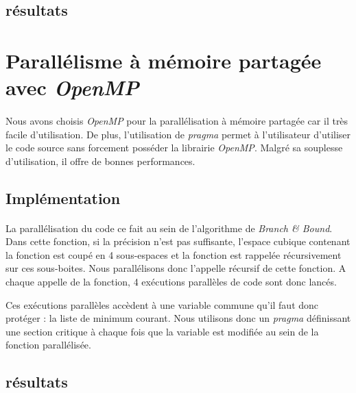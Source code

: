 \documentclass[a4paper]{article}
\begin{document}
    \subsection{résultats}
    \paragraph{}
    
\section{Parallélisme à mémoire partagée avec \emph{OpenMP}}
	\paragraph{}
	Nous avons choisis \emph{OpenMP} pour la parallélisation à mémoire partagée car il très facile d'utilisation. De plus, l'utilisation de \emph{pragma} permet à l'utilisateur d'utiliser le code source sans forcement posséder la librairie \emph{OpenMP}. Malgré sa souplesse d'utilisation, il offre de bonnes performances.
    \subsection{Implémentation}
    \paragraph{}
    La parallélisation du code ce fait au sein de l'algorithme de \emph{Branch \& Bound}. Dans cette fonction, si la précision n'est pas suffisante, l'espace cubique contenant la fonction est coupé en 4 sous-espaces et la fonction est rappelée récursivement sur ces sous-boites. Nous parallélisons donc l'appelle récursif de cette fonction. A chaque appelle de la fonction, 4 exécutions parallèles de code sont donc lancés.
    
    Ces exécutions parallèles accèdent à une variable commune qu'il faut donc protéger : la liste de minimum courant. Nous utilisons donc un \emph{pragma} définissant une section critique à chaque fois que la variable est modifiée au sein de la fonction parallélisée.
    \subsection{résultats}
    \paragraph{}
    
\end{document}
